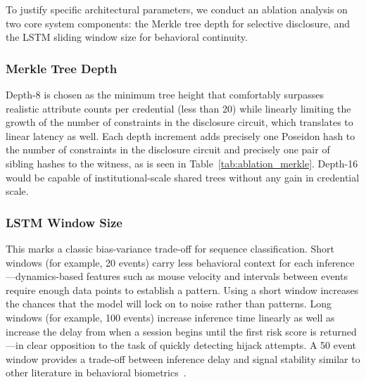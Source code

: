 \documentclass[journal,twoside,10pt]{IEEEtran}
\begin{document}
To justify specific architectural parameters, we conduct an ablation analysis on two core system components: the Merkle tree depth for selective disclosure, and the LSTM sliding window size for behavioral continuity.

\subsubsection{Merkle Tree Depth}
Depth-8 is chosen as the minimum tree height that comfortably surpasses realistic attribute counts per credential (less than 20) while linearly limiting the growth of the number of constraints in the disclosure circuit, which translates to linear latency as well. Each depth increment adds precisely one Poseidon hash to the number of constraints in the disclosure circuit and precisely one pair of sibling hashes to the witness, as is seen in Table~\ref{tab:ablation_merkle}. Depth-16 would be capable of institutional-scale shared trees without any gain in credential scale.
\begin{table}[!t]
\renewcommand{\arraystretch}{1.2}
\caption{Ablation: Merkle Tree Depth vs. Proving Cost Estimates}
\label{tab:ablation_merkle}
\centering
{}
\end{table}

\subsubsection{LSTM Window Size}
This marks a classic bias-variance trade-off for sequence classification. Short windows (for example, 20 events) carry less behavioral context for each inference---dynamics-based features such as mouse velocity and intervals between events require enough data points to establish a pattern. Using a short window increases the chances that the model will lock on to noise rather than patterns. Long windows (for example, 100 events) increase inference time linearly as well as increase the delay from when a session begins until the first risk score is returned---in clear opposition to the task of quickly detecting hijack attempts. A 50 event window provides a trade-off between inference delay and signal stability similar to other literature in behavioral biometrics~\cite{typenet}.
\end{document}

